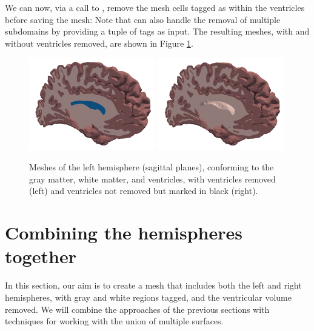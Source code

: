 We can now, via a call to \svmtk{} ,
remove the mesh cells tagged as within the ventricles before saving
the mesh:
Note that  can also handle the removal of
multiple subdomains by providing a tuple of tags as input. The resulting
meshes, with and without ventricles removed, are shown in Figure
\ref{fig:chp4:tags-with-without-ventricles}.
\begin{center}
\begin{figure}
  \includegraphics[width=0.49\textwidth]{./graphics/chp4/ernie-final-comp-b}
  \includegraphics[width=0.49\textwidth]{./graphics/chp4/ernie-final-comp-d}
    \caption{Meshes of the left hemisphere (sagittal planes),
      conforming to the gray matter, white matter, and ventricles, with
      ventricles removed (left) and ventricles not removed but marked
      in black (right).}
    \label{fig:chp4:tags-with-without-ventricles}
\end{figure}
\end{center}

\section{Combining the hemispheres together}
\label{sec:chp4-left-right-tagged}

In this section, our aim is to create a mesh that includes both the
left and right hemispheres, with gray and white regions tagged, and
the ventricular volume removed. We will combine the approaches of the
previous sections with \svmtk{} techniques for
working with the union of multiple surfaces. 

